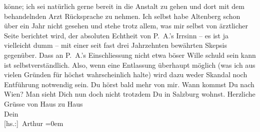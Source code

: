 \begin{ledgroupsized}[t]{13cm}
               könne; ich sei natürlich gerne bereit in die Anstalt zu gehen und dort mit dem
               behandelnden Arzt Rücksprache
               zu nehmen. Ich selbst habe Altenberg schon über
               ein Jahr nicht gesehen und stehe trotz allem, was mir selbst von ärztlicher Seite
               berichtet wird, der absoluten Echtheit von P. A.’s
                  Irr{\pb}sinn – es ist ja
               vielleicht dumm – mit einer seit fast drei Jahrzehnten bewährten Skepsis gegenüber.
               Dass an P. A.’s Einschliessung nicht etwa böser
               Wille schuld sein kann ist selbstverständlich. Also, wenn eine Entlassung überhaupt
               möglich (was ich aus vielen Gründen für höchst wahrscheinlich halte) wird dazu weder
               Skandal noch Entführung notwendig sein. Du hörst bald mehr von mir. Wann kommst Du
               nach Wien? Man sieht Dich nun doch nicht trotzdem Du
               in Salzburg wohnst.\pend
           \pstart
           Herzliche Grüsse von Haus zu Haus{\\[\baselineskip]}Dein{\\[\baselineskip]}\spacefill\mbox{{[}hs.:{]} Arthur}\pend
           \leftskip=0em{}
         
         \endnumbering{}\end{ledgroupsized}  \newcommand{\dateiname}{L02122}\newcommand{\titel}{Arthur Schnitzler an Hermann Bahr, 18. 4. 1913}\newcommand{\editorInnen}{ Kurt Ifkovits,  Martin Anton Müller}
      